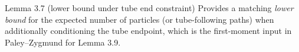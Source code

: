 \begin{block}{Lemma 3.7 (lower bound under tube end constraint)}
Provides a matching \emph{lower bound} for the expected number of particles (or tube-following paths) when additionally conditioning the tube endpoint, which is the first-moment input in Paley--Zygmund for Lemma 3.9.
\end{block}

